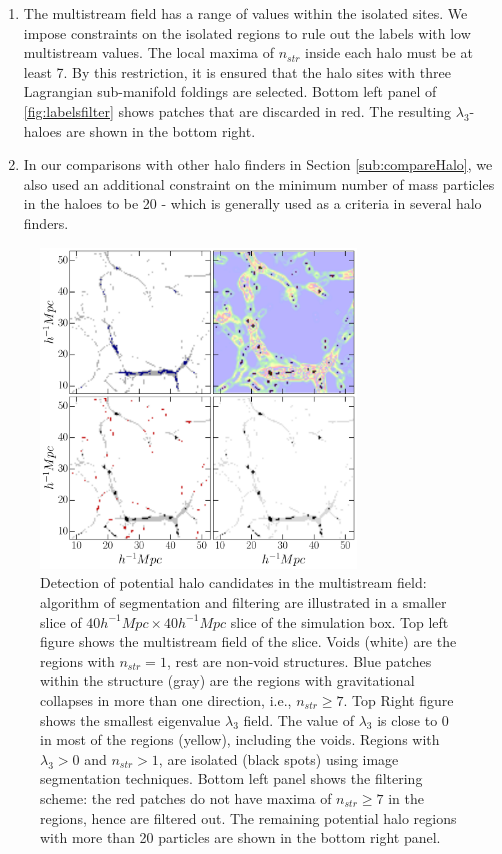 \documentclass[fleqn,usenatbib,useAMS]{mnras}
\begin{document}
{\begin{enumerate}
\item The multistream field has a range of values within the isolated sites. We impose constraints on the isolated regions to rule out the labels with low multistream values. The local maxima of $n_{str}$ inside each halo must be at least 7. By this restriction, it is ensured that the halo sites with three Lagrangian sub-manifold foldings are selected. Bottom left panel of \autoref{fig:labelsfilter} shows patches that are discarded in red. The resulting $\lambda_3$-haloes are shown in the bottom right.  
  

\item In our comparisons with other halo finders in Section \ref{sub:compareHalo}, we also used an additional constraint on the minimum number of mass particles in the haloes to be 20 - which is generally used as a criteria in several halo finders. 

\end{enumerate} 


\begin{figure}
\begin{minipage}[t]{0.99\linewidth}
 \centering\includegraphics[height=8.5cm]{fig3.pdf} 
\end{minipage}\hfill
\caption{ Detection of potential halo candidates in the multistream field: algorithm of segmentation and filtering are illustrated in a smaller slice of $40 h^{-1} Mpc \times 40 h^{-1} Mpc$ slice of the simulation box. Top left figure shows the multistream field of the slice. Voids (white) are the regions with $n_{str} =1$, rest are non-void structures. Blue patches within the structure (gray) are the regions with gravitational collapses in more than one direction, i.e., $n_{str} \geq 7$. Top Right figure shows the smallest eigenvalue $\lambda_3$ field. The value of $\lambda_3$ is close to 0 in most of the regions (yellow), including the voids. Regions with  $\lambda_3 > 0$ and $n_{str} > 1$, are isolated (black spots) using image segmentation techniques. Bottom left panel shows the filtering scheme: the red patches do not have maxima of $n_{str} \geq 7$ in the regions, hence are filtered out. The remaining potential halo regions with more than 20 particles are shown in the bottom right panel.}
\label{fig:labelsfilter}
\end{figure}

}
\end{document}
